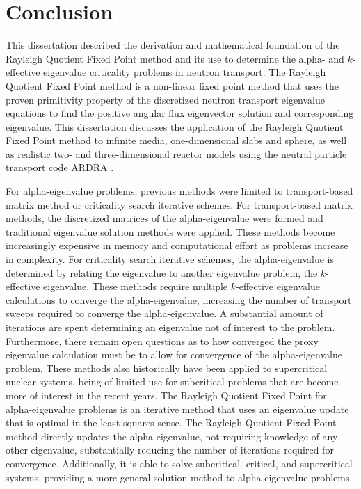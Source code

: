 \chapter{Conclusion}
\label{ch:Conc}

This dissertation described the derivation and mathematical foundation of the Rayleigh Quotient Fixed Point method and its use to determine the alpha- and $k$-effective eigenvalue criticality problems in neutron transport. The Rayleigh Quotient Fixed Point method is a non-linear fixed point method that uses the proven primitivity property of the discretized neutron transport eigenvalue equations to find the positive angular flux eigenvector solution and corresponding eigenvalue. This dissertation discusses the application of the Rayleigh Quotient Fixed Point method to infinite media, one-dimensional slabs and sphere, as well as realistic two- and three-dimensional reactor models using the neutral particle transport code ARDRA \cite{hanebutte_ardra_1999}.

For alpha-eigenvalue problems, previous methods were limited to transport-based matrix method or criticality search iterative schemes. For transport-based matrix methods, the discretized matrices of the alpha-eigenvalue were formed and traditional eigenvalue solution methods were applied. These methods become increasingly expensive in memory and computational effort as problems increase in complexity. For criticality search iterative schemes, the alpha-eigenvalue is determined by relating the eigenvalue to another eigenvalue problem, the $k$-effective eigenvalue. These methods require multiple $k$-effective eigenvalue calculations to converge the alpha-eigenvalue, increasing the number of transport sweeps required to converge the alpha-eigenvalue. A substantial amount of iterations are spent determining an eigenvalue not of interest to the problem. Furthermore, there remain open questions as to how converged the proxy eigenvalue calculation must be to allow for convergence of the alpha-eigenvalue problem. These methods also historically have been applied to supercritical nuclear systems, being of limited use for subcritical problems that are become more of interest in the recent years. The Rayleigh Quotient Fixed Point for alpha-eigenvalue problems is an iterative method that uses an eigenvalue update that is optimal in the least squares sense. The Rayleigh Quotient Fixed Point method directly updates the alpha-eigenvalue, not requiring knowledge of any other eigenvalue, substantially reducing the number of iterations required for convergence. Additionally, it is able to solve subcritical. critical, and supercritical systems, providing a more general solution method to alpha-eigenvalue problems.

